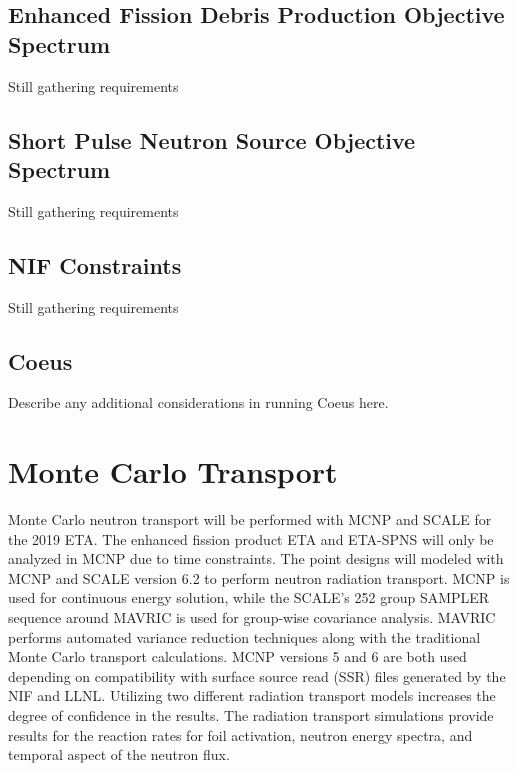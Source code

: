 \subsection{Enhanced Fission Debris Production Objective Spectrum}

Still gathering requirements

\subsection{Short Pulse Neutron Source Objective Spectrum}

Still gathering requirements 

\subsection{NIF Constraints}

Still gathering requirements

\subsection{Coeus}

Describe any additional considerations in running Coeus here.

\section{Monte Carlo Transport}

Monte Carlo neutron transport will be performed with MCNP and SCALE for the 2019 ETA. 
The enhanced fission product ETA and ETA-SPNS will only be analyzed in MCNP due to time constraints. %
The point designs will modeled with MCNP and SCALE version 6.2 to perform neutron radiation transport. 
MCNP is used for continuous energy solution, while the SCALE's 252 group SAMPLER sequence around MAVRIC is used for group-wise covariance analysis. 
MAVRIC performs automated variance reduction techniques along with the traditional Monte Carlo transport calculations. 
MCNP versions 5 and 6 are both used depending on compatibility with surface source read (SSR) files generated by the NIF and LLNL. 
Utilizing two different radiation transport models increases the degree of confidence in the results. 
The radiation transport simulations provide results for the reaction rates for foil activation, neutron energy spectra, and temporal aspect of the neutron flux. 

